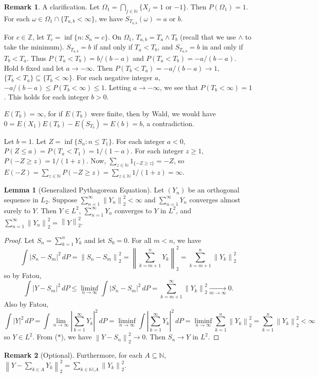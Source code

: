 \documentclass{article}
\newcommand{\Z}{\mathbb{Z}}
\newcommand{\N}{\mathbb{N}}
\newcommand{\norm}[1]{\left\lVert#1\right\rVert} %
\theoremstyle{definition}
\newtheorem{lemma}[theorem]{Lemma}
\newtheorem*{remark}{Remark}
\begin{document}
\begin{remark}
A clarification. Let $\Omega_1 = \bigcap_{j \in \N} \{X_j = 1$ or $-1\}$. Then $P(\Omega_1) = 1$. For each $\omega \in \Omega_1 \cap \{T_{a,b} < \infty\}$, we have $S_{T_{a,b}}(\omega) = a$ or $b$.

For $c \in \Z$, let $T_c = \inf\{n : S_n = c\}$. On $\Omega_1$, $T_{a,b} = T_a \wedge T_b$ (recall that we use $\wedge$ to take the minimum). $S_{T_{a,b}} = b$ if and only if $T_a < T_b$, and $S_{T_{a,b}} = b$ in and only if $T_b < T_a$. Thus $P(T_a < T_b) = b/(b-a)$ and $P(T_a < T_b) = -a/(b-a)$. Hold $b$ fixed and let $a \to -\infty$. Then $P(T_b < T_a) = -a/(b-a) \to 1$, $\{T_b < T_a\} \subseteq \{T_b < \infty\}$. For each negative integer $a$, $-a/(b-a) \leq P(T_b < \infty) \leq 1$.
Letting $a \to -\infty$, we see that $P(T_b < \infty) = 1$. This holds for each integer $b > 0$.

$E(T_b) = \infty$, for if $E(T_b)$ were finite, then by Wald, we would have $0 = E(X_1)E(T_b) - E(S_{T_b}) = E(b) = b$, a contradiction.

Let $b = 1$. Let $Z = \inf\{S_n : n \leq T_1\}$. For each integer $a < 0$, $P(Z \leq a) = P(T_a < T_1) = 1/(1-a)$. For each integer $z \geq 1$, $P(-Z \geq z) = 1/(1+z)$. Now,
$\sum_{z \in \N} 1_{\{-Z \geq z\}} = -Z$, so $E(-Z) = \sum_{z \in \N} P(-Z \geq z) = \sum_{z \in\N} 1/(1+z) =\infty$.
\end{remark}

\begin{lemma}[Generalized Pythagorean Equation]
    Let $(Y_n)$ be an orthogonal sequence in $L_2$. Suppose $\sum_{n=1}^\infty \norm{Y_n}_2^2 < \infty$ and $\sum_{n=1}^\infty Y_n$ converges almost surely to $Y$. Then $Y \in L^2$, $\sum_{n=1}^\infty Y_n$ converges to $Y$ in $L^2$, and $\sum_{n=1}^\infty \norm{Y_n}_2^2 = \norm{Y}_2^2$.
\end{lemma}
\begin{proof}
    Let $S_n = \sum_{k=1}^n Y_k$ and let $S_0 = 0$. For all $m < n$, we have
    \[
        \int |S_n - S_m|^2 \,dP = \norm{S_n - S_m}_2^2 = \norm{\sum_{k=m+1}^n Y_k}_2^2 = \sum_{k=m+1}^n \norm{Y_k}_2^2
    \]
    so by Fatou,
    \[
        \int |Y - S_m|^2 \,dP \leq \liminf_{n \to \infty} \int |S_n - S_m|^2 \,dP = \sum_{k=m+1}^\infty \norm{Y_k}_2^2 \xrightarrow[m \to \infty]{} 0. \tag{$*$}
    \]
    Also by Fatou,
    \[
        \int |Y|^2 \,dP = \int \lim_{n\to\infty} \left| \sum_{k=1}^\infty Y_k \right|^2 \,dP = \liminf_{n \to \infty} \int \left| \sum_{k=1}^\infty Y_k \right|^2 \,dP = \liminf_{n \to \infty} \sum_{k=1}^n \norm{Y_k}_2^2 = \sum_{k=1}^n \norm{Y_k}_2^2 < \infty
    \]
    so $Y \in L^2$. From ($*$), we have $\norm{Y - S_n}_2^2 \to 0$. Then $S_n \to Y$ in $L^2$.
\end{proof}
\begin{remark}[Optional]
Furthermore, for each $A \subseteq \N$, $\norm{Y - \sum_{k \in A} Y_k}_2^2 = \sum_{k \in \N \setminus A} \norm{Y_k}_2^2$.
\end{remark}
\end{document}
